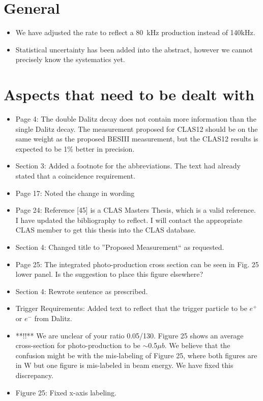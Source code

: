 \documentclass[10pt,a4paper]{report}
\author{Michael C. Kunkel}
\begin{document}
	\section*{General}
	\begin{itemize}
		\item We have adjusted the rate to reflect a 80~kHz production instead of 140kHz.
		\item Statistical uncertainty has been added into the abstract, however we cannot precisely know the systematics yet. 
	\end{itemize}
	\section*{Aspects that need to be dealt with}
	\begin{itemize}
		\item Page 4: The double Dalitz decay does not contain more information than the single Dalitz decay. The measurement proposed for CLAS12 should be on the same weight as the proposed BESIII measurement, but the CLAS12 results is expected to be 1\% better in precision.
		\item Section 3: Added a footnote for the abbreviations. The text had already stated that a coincidence requirement.
		\item Page 17: Noted the change in wording
		\item Page 24: Reference [45] is a CLAS Masters Thesis, which is a valid reference. I have updated the bibliography to reflect. I will contact the appropriate CLAS member to get this thesis into the CLAS database.
		\item Section 4: Changed title to ''Proposed Measurement`` as requested.
		\item Page 25: The integrated photo-production cross section can be seen in Fig. 25 lower panel. Is the suggestion to place this figure elsewhere?
		\item Section 4: Rewrote sentence as prescribed.
		\item Trigger Requirements: Added text to reflect that the trigger particle to be $e^+$ or $e^-$ from Dalitz.
		\item **!!** We are unclear of your ratio 0.05/130. Figure 25 shows an average cross-section for photo-production to be $\sim$0.5$\mu b$. We believe that the confusion might be with the mis-labeling of Figure 25, where both figures are in W but one figure is mis-labeled in beam energy. We have fixed this discrepancy.
		\item Figure 25: Fixed x-axis labeling.

\end{itemize}
\end{document}
